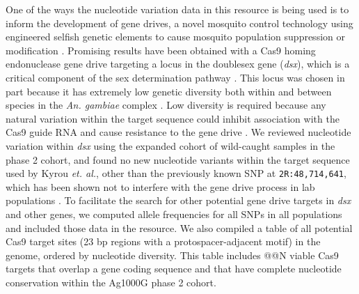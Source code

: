 \documentclass[a4paper,11pt,abstracton,hidelinks]{scrartcl}
\begin{document}
%
One of the ways the nucleotide variation data in this resource is being used is to inform the development of gene drives, a novel mosquito control technology using engineered selfish genetic elements to cause mosquito population suppression or modification \cite{burt2003, gantz2015, hammond2016, eckhoff2017, kyrou2018}.
%
Promising results have been obtained with a Cas9 homing endonuclease gene drive targeting a locus in the doublesex gene (\textit{dsx}), which is a critical component of the sex determination pathway \cite{kyrou2018}.
%
This locus was chosen in part because it has extremely low genetic diversity both within and between species in the \textit{An. gambiae} complex \cite{Ag1000G2017}.
%
Low diversity is required because any natural variation within the target sequence could inhibit association with the Cas9 guide RNA and cause resistance to the gene drive \cite{unckless2017}.
%
We reviewed nucleotide variation within \textit{dsx} using the expanded cohort of wild-caught samples in the phase 2 cohort, and found no new nucleotide variants within the target sequence used by Kyrou \textit{et. al.}, other than the previously known SNP at \texttt{2R:48,714,641}, which has been shown not to interfere with the gene drive process in lab populations \cite{kyrou2018}.
%
To facilitate the search for other potential gene drive targets in \textit{dsx} and other genes, we computed allele frequencies for all SNPs in all populations and included those data in the resource.
%
We also compiled a table of all potential Cas9 target sites (23 bp regions with a protospacer-adjacent motif) in the genome, ordered by nucleotide diversity.
%
This table includes @@N viable Cas9 targets that overlap a gene coding sequence and that have complete nucleotide conservation within the Ag1000G phase 2 cohort.
\end{document}
